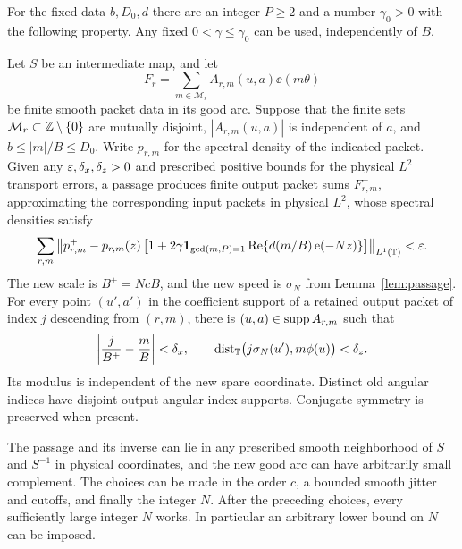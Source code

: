 \begin{lemma}
\label{lem:signal}
For the fixed data $b,D_0,d$ there are an integer $P\ge2$ and a number
$\gamma_0>0$ with the following property.  Any fixed
$0<\gamma\le\gamma_0$ can be used, independently of $B$.

Let $S$ be an intermediate map, and let
\[
 F_r=\sum_{m\in\mathcal M_r} A_{r,m}(u,a)\ee(m\theta)
\]
be finite smooth packet data in its good arc.  Suppose that the finite
sets $\mathcal M_r\subset\mathbb Z\setminus\{0\}$ are mutually disjoint,
$|A_{r,m}(u,a)|$ is independent of $a$, and
$b\le |m|/B\le D_0$.  Write $p_{r,m}$ for the spectral density of the
indicated packet. Given any $\varepsilon,\delta_x,\delta_z>0$ and prescribed
positive bounds for the physical $L^2$ transport errors, a passage produces
finite output packet sums $F_{r,m}^+$, approximating the corresponding
input packets in physical $L^2$, whose spectral densities satisfy
\begin{equation}
 \sum_{r,m}\left\|p_{r,m}^+
 -p_{r,m}(z)\left[1+2\gamma\mathbf 1_{\gcd(m,P)=1}
       \operatorname{Re}\{d(m/B)\operatorname{e}(-Nz)\}\right]\right\|_{L^1(\mathbb T)}
 <\varepsilon.
 \label{eq:signal-conclusion}
\end{equation}
The new scale is $B^+=NcB$, and the new speed is $\sigma_N$ from
Lemma~\ref{lem:passage}. For every point $(u',a')$ in the coefficient
support of a retained output packet of index $j$ descending from
$(r,m)$, there is $(u,a)\in\operatorname{supp} A_{r,m}$ such that
\begin{equation}
 \left|\frac{j}{B^+}-\frac mB\right|<\delta_x,
 \qquad
 \operatorname{dist}_\mathbb T\bigl(j\sigma_N(u'),m\phi(u)\bigr)<\delta_z.
 \label{eq:signal-support-closeness}
\end{equation}
Its modulus is independent of the new spare coordinate. Distinct old
angular indices have disjoint output angular-index supports.
Conjugate symmetry is preserved when present.

The passage and its inverse can lie in any prescribed smooth
neighborhood of $S$ and $S^{-1}$ in physical coordinates, and the new
good arc can have arbitrarily small complement.  The choices can be made
in the order $c$, a bounded smooth jitter and cutoffs, and finally the
integer $N$.  After the preceding choices, every sufficiently large
integer $N$ works.  In particular an arbitrary lower bound on $N$ can
be imposed.
\end{lemma}

